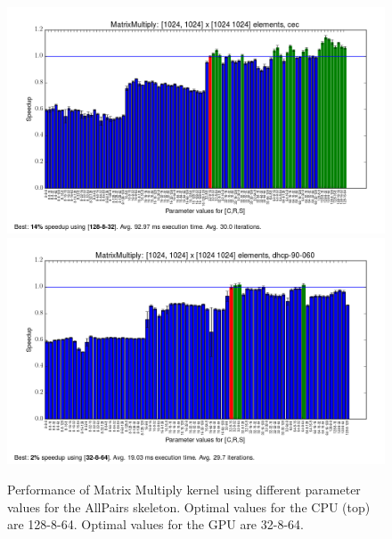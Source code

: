 \begin{figure}[h]
\includegraphics[width=\textwidth]{../../benchmarks/results/e2/MatrixMultiply-1024-1024-1024-cec.png}
\includegraphics[width=\textwidth]{../../benchmarks/results/e2/MatrixMultiply-1024-1024-1024-dhcp-90-060.png}
\caption{Performance of Matrix Multiply kernel using different
  parameter values for the AllPairs skeleton. Optimal values for the
  CPU (top) are 128-8-64. Optimal values for the GPU are 32-8-64.}
\label{fig:mm}
\end{figure}

